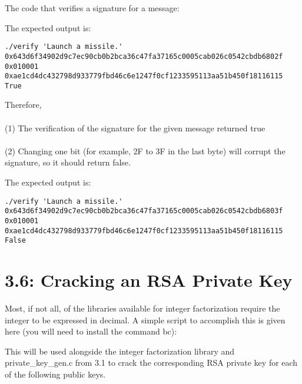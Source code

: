 \documentclass[a4paper,11pt]{article}
\theoremstyle{mytheor}
\begin{document}
\vspace{4mm}
\noindent The code that verifies a signature for a message:
\vspace{4mm} %


\vspace{4mm}
\noindent The expected output is:

\begin{verbatim}
./verify 'Launch a missile.' 
0x643d6f34902d9c7ec90cb0b2bca36c47fa37165c0005cab026c0542cbdb6802f
0x010001
0xae1cd4dc432798d933779fbd46c6e1247f0cf1233595113aa51b450f18116115
True
\end{verbatim}

\noindent Therefore, \\
\\ \noindent (1) The verification of the signature for the given message returned true \\
\\ \noindent (2) Changing one bit (for example, 2F to 3F in the last byte) will corrupt the signature, so it should return false.

\vspace{4mm}
\noindent The expected output is:

\begin{verbatim}
./verify 'Launch a missile.'
0x643d6f34902d9c7ec90cb0b2bca36c47fa37165c0005cab026c0542cbdb6803f
0x010001
0xae1cd4dc432798d933779fbd46c6e1247f0cf1233595113aa51b450f18116115
False
\end{verbatim}
\vspace{-4mm}
\section*{\large 3.6: Cracking an RSA Private Key}

Most, if not all, of the libraries available for integer factorization require the integer to be expressed in decimal. A simple script to accomplish this is given here (you will need to install the command bc):

\vspace{4mm} %
 
\vspace{4mm}
\noindent This will be used alongside the integer factorization library and private\_key\_gen.c from 3.1 to crack the corresponding RSA private key for each of the following public keys. \\
\end{document}
